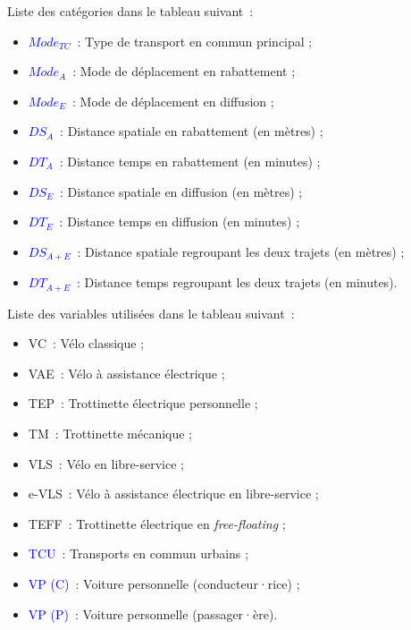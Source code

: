 Liste des catégories dans le tableau suivant~:
\begin{itemize}
    \item \textcolor{blue}{$Mode_{TC}$}~: Type de transport en commun principal ;
    \item \textcolor{blue}{$Mode_{A}$}~: Mode de déplacement en \gls{rabattement} ;
    \item \textcolor{blue}{$Mode_{E}$}~: Mode de déplacement en \gls{diffusion} ;
    \item \textcolor{blue}{$DS_{A}$}~: Distance spatiale en \gls{rabattement} (en mètres) ;
    \item \textcolor{blue}{$DT_{A}$}~: Distance temps en \gls{rabattement} (en minutes) ;
    \item \textcolor{blue}{$DS_{E}$}~: Distance spatiale en \gls{diffusion} (en mètres) ;
    \item \textcolor{blue}{$DT_{E}$}~: Distance temps en \gls{diffusion} (en minutes) ;
    \item \textcolor{blue}{$DS_{A+E}$}~: Distance spatiale regroupant les deux trajets (en mètres) ;
    \item \textcolor{blue}{$DT_{A+E}$}~: Distance temps regroupant les deux trajets (en minutes).
\end{itemize}\par

Liste des variables utilisées dans le tableau suivant~:
\begin{itemize}
    \item VC~: Vélo classique ;
    \item VAE~: Vélo à assistance électrique ;
    \item TEP~: Trottinette électrique personnelle ;
    \item TM~: Trottinette mécanique ;
    \item VLS~: Vélo en libre-service ;
    \item e-VLS~: Vélo à assistance électrique en libre-service ;
    \item TEFF~: Trottinette électrique en \textsl{free-floating} ;
    \item \textcolor{blue}{TCU}~: Transports en commun urbains ;
    \item \textcolor{blue}{VP (C)}~: Voiture personnelle (conducteur·rice) ; 
    \item \textcolor{blue}{VP (P)}~: Voiture personnelle (passager·ère).
\end{itemize}\par
    
